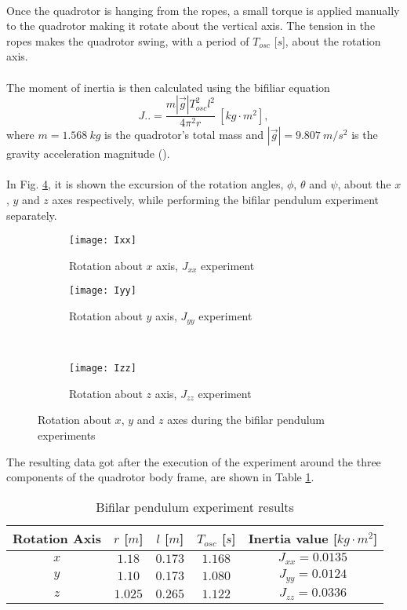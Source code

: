 \\Once the quadrotor is hanging from the ropes, a small torque is applied manually to the quadrotor making it rotate about the vertical axis. The tension in the ropes makes the quadrotor swing, with a period of $T_{osc}$ [$s$], about the rotation axis.
\\\\
The moment of inertia is then calculated using the bifiliar equation
\begin{equation}
J.. = \dfrac{m|\vec{g}|T_{osc}^{2}l^{2}}{4\pi^{2}r}\ [kg\cdot m^{2}],
\end{equation}
where $m = 1.568\ kg$ is the quadrotor's total mass and $|\vec{g}| = 9.807\ m/s^{2}$ is the gravity acceleration magnitude (\cite{Mustapa2016}).
\\\\
In Fig. \ref{fig:inertiatest}, it is shown the excursion of the rotation angles, $\phi$, $\theta$ and $\psi$, about the $x$, $y$ and $z$ axes respectively, while performing the bifilar pendulum experiment separately.
\begin{figure}[H]
\begin{subfigure}{.5\linewidth}
\centering
\texttt{[image: Ixx]}
\caption{Rotation about $x$ axis, $J_{xx}$ experiment}
\label{fig:Jxx}
\end{subfigure}%
\begin{subfigure}{.5\linewidth}
\centering
\texttt{[image: Iyy]}
\caption{Rotation about $y$ axis, $J_{yy}$ experiment}
\label{fig:Jyy}
\end{subfigure}\\[1ex]
\begin{subfigure}{\linewidth}
\centering
\texttt{[image: Izz]}
\caption{Rotation about $z$ axis, $J_{zz}$ experiment}
\label{fig:Jzz}
\end{subfigure}
\caption{Rotation about $x$, $y$ and $z$ axes during the bifilar pendulum experiments}
\label{fig:inertiatest}
\end{figure}
The resulting data got after the execution of the experiment around the three components of the quadrotor body frame, are shown in Table \ref{tb:inertiaexperiment}.
\begin{table}[H]
\small
\begin{center}
\caption{Bifilar pendulum experiment results}\label{tb:inertiaexperiment}
\begin{tabular}{c|c|c|c|c}\hline
\rule{0pt}{3ex} Rotation Axis & $r$ [$m$] & $l$ [$m$] & $T_{osc}$ [$s$] & Inertia value [$kg\cdot m^{2}$] \\\hline\hline
\rule{0pt}{3ex} $x$ &  $1.18$ & $0.173$ & $1.168$ & $J_{xx} = 0.0135$ \\[0.7ex]
$y$ &  $1.10$ & $0.173$ & $1.080$ & $J_{yy} = 0.0124$ \\[0.7ex]
$z$ &  $1.025$ & $0.265$ & $1.122$ & $J_{zz} = 0.0336$ \\[0.7ex]\hline
\end{tabular}
\end{center}
\end{table}

